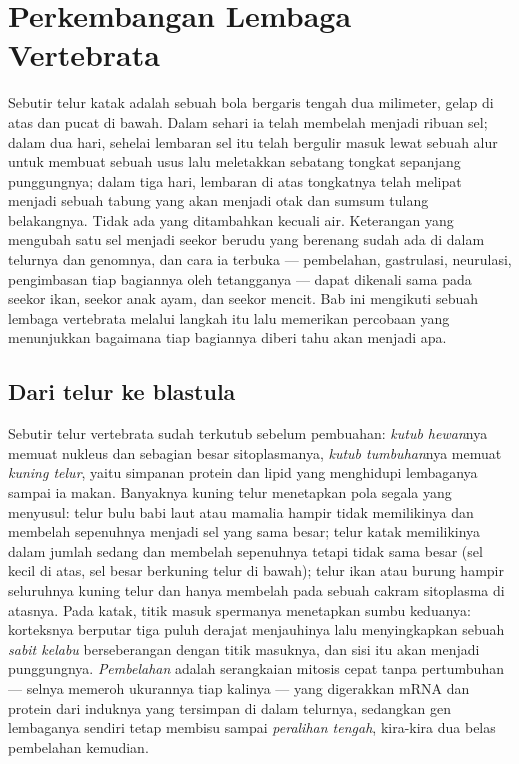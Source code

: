 \chapter{Perkembangan Lembaga Vertebrata}\label{ch:b2:vertebrate-development}

Sebutir telur katak adalah sebuah bola bergaris tengah dua milimeter,
gelap di atas dan pucat di bawah. Dalam sehari ia telah membelah
menjadi ribuan sel; dalam dua hari, sehelai lembaran sel itu telah
bergulir masuk lewat sebuah alur untuk membuat sebuah usus lalu
meletakkan sebatang tongkat sepanjang punggungnya; dalam tiga hari,
lembaran di atas tongkatnya telah melipat menjadi sebuah tabung yang
akan menjadi otak dan sumsum tulang belakangnya. Tidak ada yang
ditambahkan kecuali air. Keterangan yang mengubah satu sel menjadi
seekor berudu yang berenang sudah ada di dalam telurnya dan genomnya,
dan cara ia terbuka --- pembelahan, gastrulasi, neurulasi, pengimbasan
tiap bagiannya oleh tetangganya --- dapat dikenali sama pada seekor
ikan, seekor anak ayam, dan seekor mencit. Bab ini mengikuti sebuah
lembaga vertebrata melalui langkah itu lalu memerikan percobaan yang
menunjukkan bagaimana tiap bagiannya diberi tahu akan menjadi apa.

\section{Dari telur ke blastula}

\begin{definition}\label{def:b2:vertebrate-development:egg}
Sebutir telur vertebrata sudah terkutub sebelum pembuahan:
\emph{kutub hewan}nya memuat nukleus dan sebagian besar sitoplasmanya,
\emph{kutub tumbuhan}nya memuat \emph{kuning telur}, yaitu simpanan
protein dan lipid yang menghidupi lembaganya sampai ia makan. Banyaknya
kuning telur menetapkan pola segala yang menyusul: telur bulu babi laut
atau mamalia hampir tidak memilikinya dan membelah sepenuhnya menjadi
sel yang sama besar; telur katak memilikinya dalam jumlah sedang dan
membelah sepenuhnya tetapi tidak sama besar (sel kecil di atas, sel
besar berkuning telur di bawah); telur ikan atau burung hampir
seluruhnya kuning telur dan hanya membelah pada sebuah cakram
sitoplasma di atasnya. Pada katak, titik masuk spermanya menetapkan
sumbu keduanya: korteksnya berputar tiga puluh derajat menjauhinya lalu
menyingkapkan sebuah \emph{sabit kelabu} berseberangan dengan titik
masuknya, dan sisi itu akan menjadi punggungnya. \emph{Pembelahan}
adalah serangkaian mitosis cepat tanpa pertumbuhan --- selnya memeroh
ukurannya tiap kalinya --- yang digerakkan mRNA dan protein dari
induknya yang tersimpan di dalam telurnya, sedangkan gen lembaganya
sendiri tetap membisu sampai \emph{peralihan 
tengah}, kira-kira dua belas pembelahan kemudian.
\end{definition}

